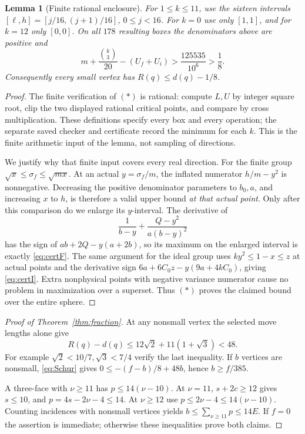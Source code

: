 \documentclass[11pt]{article}
\newtheorem{lemma}[theorem]{Lemma}
\theoremstyle{definition}\newtheorem{definition}[theorem]{Definition}
\theoremstyle{remark}\newtheorem{remark}[theorem]{Remark}
\newcommand{\nuu}{\nu}
\newcommand{\bin}[2]{\binom{#1}{#2}}
\begin{document}
\begin{lemma}[Finite rational enclosure]\label{lem:interval}
For \(1\le k\le11\), use the sixteen intervals
\([\ell,h]=[j/16,(j+1)/16]\), \(0\le j<16\).
For \(k=0\) use only \([1,1]\), and for \(k=12\) only \([0,0]\).
On all \(178\) resulting boxes the denominators above are positive and
\[
 m+\frac{\bin{k}{3}}{20}-(U_f+U_i)>\frac{125535}{10^6}>\frac18.
 \tag{\(*\)}
\]
Consequently every small vertex has \(R(q)\le d(q)-1/8\).
\end{lemma}
\begin{proof}
The finite verification of \((*)\) is rational: compute \(L,U\)
by integer square root, clip the two displayed rational critical
points, and compare by cross multiplication. These definitions specify
every box and every operation; the separate saved checker and
certificate record the minimum for each \(k\). This is the finite
arithmetic input of the lemma, not sampling of directions.

We justify why that finite input covers every real direction.
For the finite group
\(\sqrt x\le\sigma_f\le\sqrt{mx}\).
At an actual \(y=\sigma_f/m\), the inflated numerator
\(h/m-y^2\) is nonnegative. Decreasing the positive denominator
parameters to \(b_0,a\), and increasing \(x\) to \(h\), is therefore
a valid upper bound \emph{at that actual point}. Only after this
comparison do we enlarge its \(y\)-interval. The derivative of
\[
 \frac1{b-y}+\frac{Q-y^2}{a(b-y)^2}
\]
has the sign of \(ab+2Q-y(a+2b)\), so its maximum on the enlarged
interval is exactly \eqref{eq:certF}. The same argument for the ideal
group uses \(ky^2\le1-x\le z\) at actual points and the derivative
sign \(6a+6C_0z-y(9a+4kC_0)\), giving \eqref{eq:certI}.
Extra nonphysical points with negative variance numerator cause no
problem in maximization over a superset. Thus \((*)\) proves the
claimed bound over the entire sphere.
\end{proof}

\begin{proof}[Proof of Theorem~\ref{thm:fraction}]
At any nonsmall vertex the selected move lengths alone give
\[
 R(q)-d(q)\le12\sqrt2+11(1+\sqrt3)<48.
\]
For example \(\sqrt2<10/7,\sqrt3<7/4\) verify the last inequality.
If \(b\) vertices are nonsmall, \eqref{eq:Schur} gives
\(0\le-(f-b)/8+48b\), hence \(b\ge f/385\).

A three-face with \(\nuu\ge11\) has
\(p\le14(\nuu-10)\). At \(\nuu=11\),
\(s+2c\ge12\) gives \(s\le10\), and
\(p=4s-2\nuu-4\le14\). At \(\nuu\ge12\) use
\(p\le2\nuu-4\le14(\nuu-10)\).
Counting incidences with nonsmall vertices yields
\(b\le\sum_{\nuu\ge11}p\le14E\).
If \(f=0\) the assertion is immediate; otherwise these inequalities
prove both claims.
\end{proof}
\end{document}
